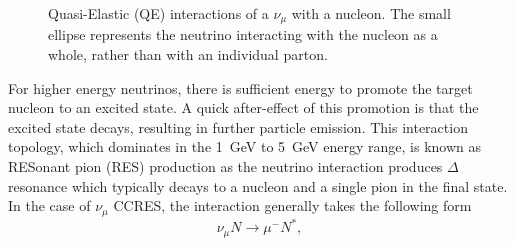 \begin{figure}%
  \centering
  \hspace{1em}
  \caption{Quasi-Elastic (QE) interactions of a $\nu_\mu$ with a nucleon.  The small ellipse represents the neutrino interacting with the nucleon as a whole, rather than with an individual parton.}
  \label{fig:QEFD}
\end{figure}
\newline
\newline
For higher energy neutrinos, there is sufficient energy to promote the target nucleon to an excited state.  A quick after-effect of this promotion is that the excited state decays, resulting in further particle emission.  This interaction topology, which dominates in the 1~GeV to 5~GeV energy range, is known as RESonant pion (RES) production as the neutrino interaction produces $\Delta$ resonance which typically decays to a nucleon and a single pion in the final state.  In the case of $\nu_\mu$ CCRES, the interaction generally takes the following form
\begin{equation}
\nu_\mu N \rightarrow \mu^- N^{*},
\label{eq:CCRES}
\end{equation}
